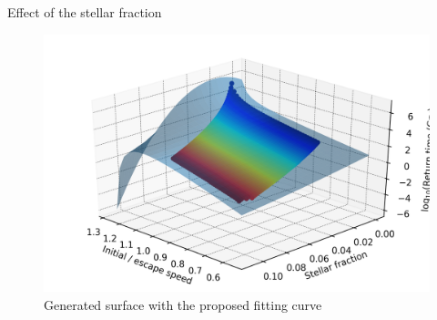 \documentclass{beamer}
\begin{document}
\begin{frame}{Effect of the stellar fraction}
	\begin{figure}[h]
		\centering
		\includegraphics[width=0.8\linewidth]{"../Files/Week 10/surface"}
		\caption{Generated surface with the proposed fitting curve}
	\end{figure}
\end{frame}
\end{document}
